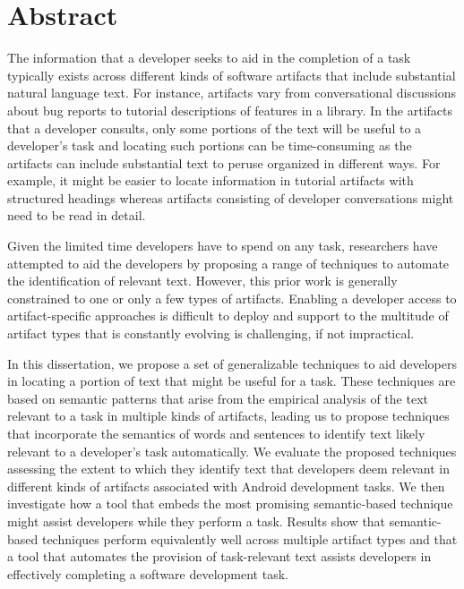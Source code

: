 

\chapter{Abstract}

The information that a developer seeks to aid in the completion of a task typically exists across different kinds of software artifacts that include substantial natural language text. For instance,
artifacts vary from conversational discussions about bug reports to tutorial descriptions of features in a library.
In the artifacts that a developer consults, only some portions of the text will be useful to a developer's task
and locating such portions can be time-consuming as the artifacts can include substantial text to peruse organized in different ways. For example, it might be easier to locate information
in tutorial artifacts with structured headings whereas artifacts consisting of developer conversations might need to be read in detail. 

Given the limited time developers have to spend on any task, researchers have 
attempted to aid the developers by proposing a range of techniques to automate the identification of relevant text. 
However, this prior work is generally constrained to one or only a few types of artifacts.  
Enabling a developer access to artifact-specific approaches is difficult to deploy
and support to the multitude of artifact types that is constantly evolving
is challenging, if not impractical.

In this dissertation, we propose a set of generalizable techniques to aid developers in locating a portion of text that might be useful for a task. These techniques are based on semantic patterns that arise from the empirical analysis of the text relevant to a task in multiple kinds of artifacts, leading us to propose techniques that incorporate the semantics of words and sentences to identify text likely relevant to a developer's task automatically.
We evaluate the proposed techniques assessing the extent to which they identify text that developers deem relevant in different kinds of artifacts associated with Android development tasks. We then investigate how a tool that embeds the most promising semantic-based technique might assist developers while they perform a task. Results show that semantic-based techniques perform equivalently well across multiple artifact types and that a tool that automates the provision of task-relevant text assists developers in effectively completing a software development task.
    

